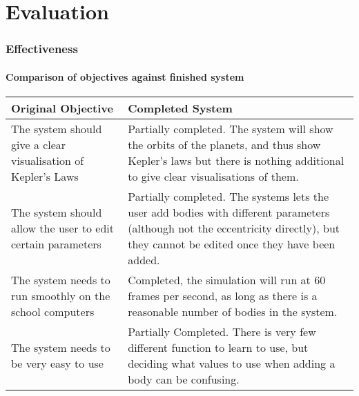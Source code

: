 \part{Evaluation}

%
%
%
%

\section{Effectiveness}
\subsection{Comparison of objectives against finished system}
\begin{tabular}{p{}p{}}
	Original Objective & Completed System \\\hline
	The system should give a clear visualisation of Kepler's Laws &
	Partially completed. The system will show the orbits of the planets, and
	thus show Kepler's laws but there is nothing additional to give clear
	visualisations of them.\\
	The system should allow the user to edit certain parameters & Partially
	completed. The systems lets the user add bodies with different
	parameters (although not the eccentricity directly), but they cannot be
	edited once they have been added. \\
	The system needs to run smoothly on the school computers & Completed,
	the simulation will run at 60 frames per second, as long as there is a
	reasonable number of bodies in the system.\\
	The system needs to be very easy to use & Partially Completed. There is
	very few different function to learn to use, but deciding what values to
	use when adding a body can be confusing.\\
\end{tabular}

